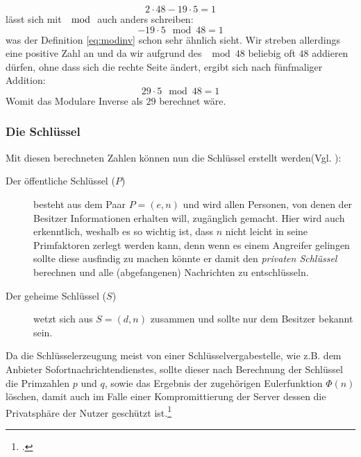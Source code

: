 \documentclass{scrarticle} %
\begin{document}
            \begin{equation}
                2\cdot48-19\cdot5=1
            \end{equation}
            lässt sich mit $\mod$ auch anders schreiben: %
            \begin{equation}
                -19\cdot5\mod{48}=1
            \end{equation}
            was der Definition \ref{eq:modinv} schon sehr ähnlich sieht. Wir streben allerdings eine positive Zahl an und da wir aufgrund des $\mod{48}$ beliebig oft $48$ addieren dürfen, ohne dass sich die rechte Seite ändert, ergibt sich nach fünfmaliger Addition:
            \begin{equation}
                29\cdot5\mod{48} = 1
            \end{equation}
            Womit das Modulare Inverse als $29$ berechnet wäre.



        \subsubsection{Die Schlüssel}
            Mit diesen berechneten Zahlen können nun die Schlüssel erstellt werden(Vgl. \cite[77]{ertel2003}):
            \begin{description}
                \item[Der öffentliche Schlüssel ($P$)] besteht aus dem Paar $P=(e, n)$ und wird allen Personen, von denen der Besitzer Informationen erhalten will, zugänglich gemacht. Hier wird auch erkenntlich, weshalb es so wichtig ist, dass $n$ nicht leicht in seine Primfaktoren zerlegt werden kann, denn wenn es einem Angreifer gelingen sollte diese ausfindig zu machen könnte er damit den \emph{privaten Schlüssel} berechnen und alle (abgefangenen) Nachrichten zu entschlüsseln.
                \item[Der geheime Schlüssel ($S$)] wetzt sich aus $S=(d, n)$ zusammen und sollte nur dem Besitzer bekannt sein. 
            \end{description}
            Da die Schlüsselerzeugung meist von einer Schlüsselvergabestelle, wie z.B. dem Anbieter Sofortnachrichtendienstes, sollte dieser nach Berechnung der Schlüssel die Primzahlen $p$ und $q$, sowie das Ergebnis der zugehörigen Eulerfunktion $\Phi(n)$ löschen, damit auch im Falle einer Kompromittierung der Server dessen die Privatsphäre der Nutzer geschützt ist.\footcite[279]{dankmeier2006} %
\end{document}
